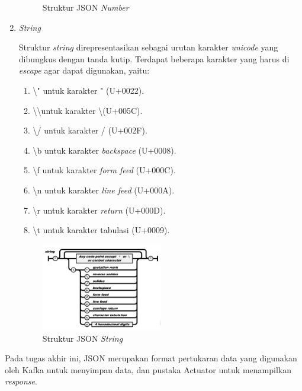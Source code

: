 \begin{enumerate}
\begin{figure}[H]
		\caption{Struktur JSON \textit{Number}}
	\end{figure}
	\item \textit{String}
	\par Struktur \textit{string} direpresentasikan sebagai urutan karakter \textit{unicode} yang dibungkus dengan tanda kutip. Terdapat beberapa karakter yang harus di \textit{escape} agar dapat digunakan, yaitu:
	\begin{enumerate}
		\item \textbackslash " untuk karakter " (U+0022).
		\item \textbackslash\textbackslash\space untuk karakter \textbackslash\space (U+005C).
		\item \textbackslash / untuk karakter / (U+002F).
		\item \textbackslash b untuk karakter \textit{backspace} (U+0008).
		\item \textbackslash f untuk karakter \textit{form feed} (U+000C).
		\item \textbackslash n untuk karakter \textit{line feed} (U+000A).
		\item \textbackslash r untuk karakter \textit{return} (U+000D).
		\item \textbackslash t untuk karakter tabulasi (U+0009).
	\end{enumerate}
	\begin{figure}[H]
		\centering\includegraphics[width=0.5\textwidth]{bab2/img/json_string.jpg}
		\caption{Struktur JSON \textit{String}}
	\end{figure}
\end{enumerate}
\par Pada tugas akhir ini, JSON merupakan format pertukaran data yang digunakan oleh Kafka untuk menyimpan data, dan pustaka Actuator untuk menampilkan \textit{response}.

